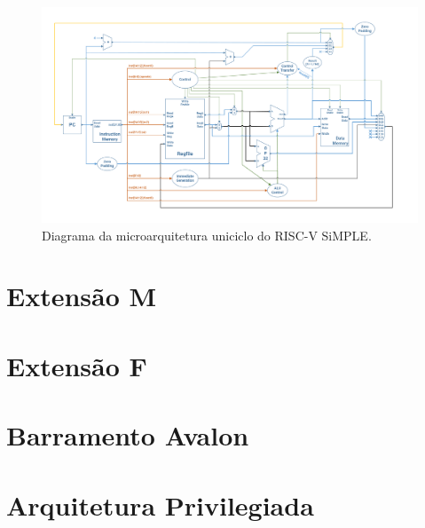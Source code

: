         \begin{figure}[H]
        \centering
            \includegraphics[width=.8\linewidth]{figs/singlecycle.png}
            \caption{Diagrama da microarquitetura uniciclo do RISC-V SiMPLE.}
            \label{fig:singlecycle}
        \end{figure}

    \section{Extensão M}
        {}

    \section{Extensão F}
        {}

    \section{Barramento Avalon}
        {}

    \section{Arquitetura Privilegiada}
        {}
